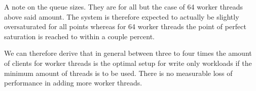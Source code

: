         A note on the queue sizes. They are for all but the case of 64 worker threads above said amount. The system is
        therefore expected to actually be slightly oversaturated for all points whereas for 64 worker threads the point
        of perfect saturation is reached to within a couple percent.

        We can therefore derive that in general between three to four times the amount of clients for worker threads is
        the optimal setup for write only workloads if the minimum amount of threads is to be used. There is no
        measurable loss of performance in adding more worker threads.
